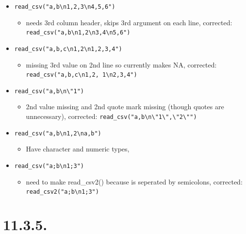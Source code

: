 \documentclass[]{book}
\providecommand{\tightlist}{%
  \setlength{\itemsep}{0pt}\setlength{\parskip}{0pt}}
\theoremstyle{definition}
\theoremstyle{definition}
\theoremstyle{definition}
\theoremstyle{remark}
\begin{document}
\begin{itemize}
\tightlist
\item
  \texttt{read\_csv("a,b\textbackslash{}n1,2,3\textbackslash{}n4,5,6")}

  \begin{itemize}
  \tightlist
  \item
    needs 3rd column header, skips 3rd argument on each line, corrected:
    \texttt{read\_csv("a,b\textbackslash{}n1,2\textbackslash{}n3,4\textbackslash{}n5,6")}
  \end{itemize}
\item
  \texttt{read\_csv("a,b,c\textbackslash{}n1,2\textbackslash{}n1,2,3,4")}

  \begin{itemize}
  \tightlist
  \item
    missing 3rd value on 2nd line so currently makes NA, corrected:
    \texttt{read\_csv("a,b,c\textbackslash{}n1,2,\ 1\textbackslash{}n2,3,4")}
  \end{itemize}
\item
  \texttt{read\_csv("a,b\textbackslash{}n\textbackslash{}"1")}

  \begin{itemize}
  \tightlist
  \item
    2nd value missing and 2nd quote mark missing (though quotes are
    unnecessary), corrected:
    \texttt{read\_csv("a,b\textbackslash{}n\textbackslash{}"1\textbackslash{}",\textbackslash{}"2\textbackslash{}"")}
  \end{itemize}
\item
  \texttt{read\_csv("a,b\textbackslash{}n1,2\textbackslash{}na,b")}

  \begin{itemize}
  \tightlist
  \item
    Have character and numeric types,
  \end{itemize}
\item
  \texttt{read\_csv("a;b\textbackslash{}n1;3")}

  \begin{itemize}
  \tightlist
  \item
    need to make read\_csv2() because is seperated by semicolons,
    corrected: \texttt{read\_csv2("a;b\textbackslash{}n1;3")}
  \end{itemize}
\end{itemize}

\hypertarget{section-30}{%
\section{11.3.5.}\label{section-30}}
\end{document}
